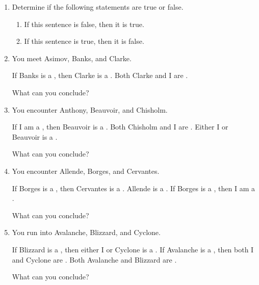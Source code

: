 \probsec{~\ref{sec:conditionals}}
\begin{enumerate}
    \item Determine if the following statements are true or false.
  \begin{enumerate}
      \item If this sentence is false, then it is true.
      \item If this sentence is true, then it is false.
  \end{enumerate}


    \item You meet Asimov, Banks, and Clarke.
  \begin{dialogue}
     If Banks is a \knight, then Clarke is a \knave.
     Both Clarke and I are \knaves.
  \end{dialogue}
  What can you conclude?

    \item You encounter Anthony, Beauvoir, and Chisholm.
  \begin{dialogue}
     If I am a \knave, then Beauvoir is a \knight.
     Both Chisholm and I are \knights.
     Either I or Beauvoir is a \knave.
  \end{dialogue}
  What can you conclude?

    \item You encounter Allende, Borges, and Cervantes.
  \begin{dialogue}
     If Borges is a \knight, then Cervantes is a \knave.
     Allende is a \knave.
     If Borges is a \knight, then I am a \knave.
  \end{dialogue}
  What can you conclude?

    \item You run into Avalanche, Blizzard, and Cyclone.
  \begin{dialogue}
     If Blizzard is a \knight, then either I or Cyclone is a \knave.
     If Avalanche is a \knave, then both I and Cyclone are \knights.
     Both Avalanche and Blizzard are \knaves.
  \end{dialogue}
  What can you conclude?


\end{enumerate}

